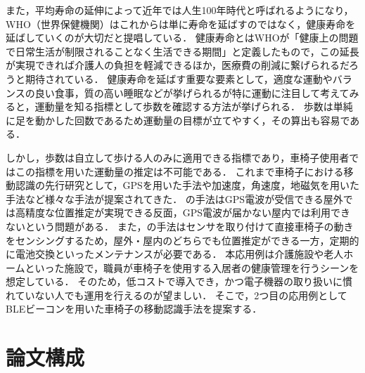 また，平均寿命の延伸によって近年では人生100年時代と呼ばれるようになり，WHO（世界保健機関）はこれからは単に寿命を延ばすのではなく，健康寿命を延ばしていくのが大切だと提唱している．
健康寿命とはWHOが「健康上の問題で日常生活が制限されることなく生活できる期間」\cite{WHO}と定義したもので，この延長が実現できれば介護人の負担を軽減できるほか，医療費の削減に繋げられるだろうと期待されている．
健康寿命を延ばす重要な要素として，適度な運動やバランスの良い食事，質の高い睡眠などが挙げられるが特に運動に注目して考えてみると，運動量を知る指標として歩数を確認する方法が挙げられる．
歩数は単純に足を動かした回数であるため運動量の目標が立てやすく，その算出も容易である．

しかし，歩数は自立して歩ける人のみに適用できる指標であり，車椅子使用者ではこの指標を用いた運動量の推定は不可能である．
これまで車椅子における移動認識の先行研究として，GPSを用いた手法\cite{gps}や加速度，角速度，地磁気を用いた手法\cite{baske}など様々な手法が提案されてきた．
\cite{gps}の手法はGPS電波が受信できる屋外では高精度な位置推定が実現できる反面，GPS電波が届かない屋内では利用できないという問題がある．
また，\cite{baske}の手法はセンサを取り付けて直接車椅子の動きをセンシングするため，屋外・屋内のどちらでも位置推定ができる一方，定期的に電池交換といったメンテナンスが必要である．
本応用例は介護施設や老人ホームといった施設で，職員が車椅子を使用する入居者の健康管理を行うシーンを想定している．
そのため，低コストで導入でき，かつ電子機器の取り扱いに慣れていない人でも運用を行えるのが望ましい．
そこで，2つ目の応用例としてBLEビーコンを用いた車椅子の移動認識手法を提案する．

\section{論文構成}
